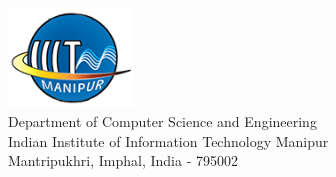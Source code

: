 \begin{titlepage}
\begin{center}
\vfill

\includegraphics[width=0.25\textwidth]{./iiitm-logo.png}\\[0.2in]
\Large{Department of Computer Science and Engineering\\
Indian Institute of Information Technology Manipur}\\
Mantripukhri, Imphal, India - 795002\\
\end{center}

\end{titlepage}
